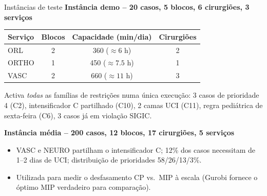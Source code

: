 \documentclass[10pt,aspectratio=169]{beamer}
\begin{document}
\begin{frame}{Inst\^ancias de teste}
  \textbf{Inst\^ancia demo -- 20 casos, 5 blocos, 6 cirurgi\~oes, 3 servi\c{c}os}
  \begin{center}\small
  \begin{tabular}{lccc}
    \toprule
    Servi\c{c}o & Blocos & Capacidade (min/dia) & Cirurgi\~oes \\
    \midrule
    ORL   & 2 & 360 ($\approx6$ h) & 2 \\
    ORTHO & 1 & 450 ($\approx7.5$ h) & 1 \\
    VASC  & 2 & 660 ($\approx11$ h) & 3 \\
    \bottomrule
  \end{tabular}
  \end{center}
  Activa \emph{todas} as fam\'ilias de restri\c{c}\~oes numa \'unica
  execu\c{c}\~ao: 3 casos de prioridade 4 (C2), intensificador C
  partilhado (C10), 2 camas UCI (C11), regra pedi\'atrica de
  sexta-feira (C6), 3 casos j\'a em viola\c{c}\~ao SIGIC.

  \vspace{0.6em}
  \textbf{Inst\^ancia m\'edia -- 200 casos, 12 blocos, 17 cirurgi\~oes, 5 servi\c{c}os}
  \begin{itemize}\footnotesize
    \item VASC e NEURO partilham o intensificador C; 12\% dos casos
      necessitam de 1--2 dias de UCI; distribui\c{c}\~ao de
      prioridades 58/26/13/3\%.
    \item Utilizada para medir o desfasamento CP vs.\ MIP \`a escala
      (Gurobi fornece o \'optimo MIP verdadeiro para compara\c{c}\~ao).
  \end{itemize}
\end{frame}
\end{document}

